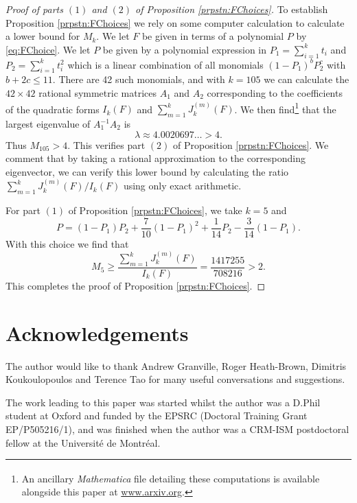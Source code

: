 \documentclass[12pt,a4paper]{amsart}
\theoremstyle{plain}
\numberwithin{sblmm}{thrm}
\numberwithin{equation}{section}
\begin{document}
\begin{proof}[Proof of parts $(1)$ and $(2)$ of Proposition \ref{prpstn:FChoices}]
To establish Proposition \ref{prpstn:FChoices} we rely on some computer calculation to calculate a lower bound for $M_k$. We let $F$ be given in terms of a polynomial $P$ by \eqref{eq:FChoice}. We let $P$ be given by a polynomial expression in $P_1=\sum_{i=1}^kt_i$ and $P_2=\sum_{i=1}^kt_i^2$ which is a linear combination of all monomials $(1-P_1)^bP_2^c$ with $b+2c\le 11$. There are \num{42} such monomials, and with $k=105$ we can calculate the $42\times 42$ rational symmetric matrices $A_1$ and $A_2$ corresponding to the coefficients of the quadratic forms $I_k(F)$ and $\sum_{m=1}^k J_k^{(m)}(F)$. We then find\footnote{An ancillary  \textit{Mathematica}\textsuperscript{\textregistered} file detailing these computations is available alongside this paper at \url{www.arxiv.org}.} that the largest eigenvalue of $A_1^{-1}A_2$ is
\begin{equation}
\lambda\approx 4.0020697\dotsc >4.
\end{equation}
Thus $M_{105}> 4$. This verifies part $(2)$ of Proposition \ref{prpstn:FChoices}. We comment that by taking a rational approximation to the corresponding eigenvector, we can verify this lower bound by calculating the ratio $\sum_{m=1}^kJ_k^{(m)}(F)/I_k(F)$ using only exact arithmetic.

For part $(1)$ of Proposition \ref{prpstn:FChoices}, we take $k=5$ and 
\begin{equation}P=(1-P_1)P_2+\frac{7}{10}(1-P_1)^2+\frac{1}{14}P_2-\frac{3}{14}(1-P_1).\end{equation}
With this choice we find that
\begin{equation}
M_5\ge \frac{\sum_{m=1}^kJ_k^{(m)}(F)}{I_k(F)}=\frac{\num{1417255}}{\num{708216}}>2.
\end{equation}
This completes the proof of Proposition \ref{prpstn:FChoices}.
\end{proof}
\section{Acknowledgements}
The author would like to thank Andrew Granville, Roger Heath-Brown, Dimitris Koukoulopoulos and Terence Tao for many useful conversations and suggestions. 

The work leading to this paper was started whilst the author was a D.Phil student at Oxford and funded by the EPSRC (Doctoral Training Grant EP/P505216/1), and was finished when the author was a CRM-ISM postdoctoral fellow at the Universit\'e de Montr\'eal.


\end{document}
